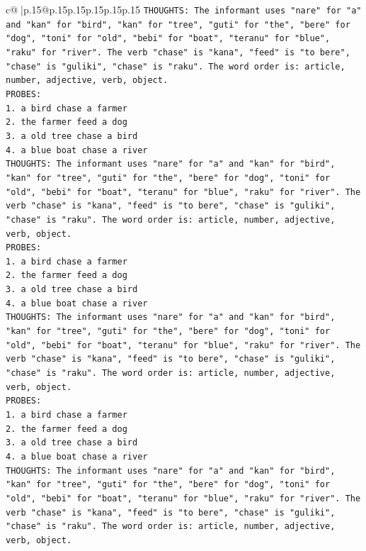 \documentclass{article}
\begin{document}
{\begin{supertabular}{c@{$\;$}|p{.15\linewidth}@{}p{.15\linewidth}p{.15\linewidth}p{.15\linewidth}p{.15\linewidth}p{.15\linewidth}}
{{{\texttt{THOUGHTS: The informant uses "nare" for "a" and "kan" for "bird", "kan" for "tree", "guti" for "the", "bere" for "dog", "toni" for "old", "bebi" for "boat", "teranu" for "blue", "raku" for "river". The verb "chase" is "kana", "feed" is "to bere", "chase" is "guliki", "chase" is "raku". The word order is: article, number, adjective, verb, object.} \\
\texttt{PROBES:} \\
\texttt{1. a bird chase a farmer} \\
\texttt{2. the farmer feed a dog} \\
\texttt{3. a old tree chase a bird} \\
\texttt{4. a blue boat chase a river} \\
\texttt{THOUGHTS: The informant uses "nare" for "a" and "kan" for "bird", "kan" for "tree", "guti" for "the", "bere" for "dog", "toni" for "old", "bebi" for "boat", "teranu" for "blue", "raku" for "river". The verb "chase" is "kana", "feed" is "to bere", "chase" is "guliki", "chase" is "raku". The word order is: article, number, adjective, verb, object.} \\
\texttt{PROBES:} \\
\texttt{1. a bird chase a farmer} \\
\texttt{2. the farmer feed a dog} \\
\texttt{3. a old tree chase a bird} \\
\texttt{4. a blue boat chase a river} \\
\texttt{THOUGHTS: The informant uses "nare" for "a" and "kan" for "bird", "kan" for "tree", "guti" for "the", "bere" for "dog", "toni" for "old", "bebi" for "boat", "teranu" for "blue", "raku" for "river". The verb "chase" is "kana", "feed" is "to bere", "chase" is "guliki", "chase" is "raku". The word order is: article, number, adjective, verb, object.} \\
\texttt{PROBES:} \\
\texttt{1. a bird chase a farmer} \\
\texttt{2. the farmer feed a dog} \\
\texttt{3. a old tree chase a bird} \\
\texttt{4. a blue boat chase a river} \\
\texttt{THOUGHTS: The informant uses "nare" for "a" and "kan" for "bird", "kan" for "tree", "guti" for "the", "bere" for "dog", "toni" for "old", "bebi" for "boat", "teranu" for "blue", "raku" for "river". The verb "chase" is "kana", "feed" is "to bere", "chase" is "guliki", "chase" is "raku". The word order is: article, number, adjective, verb, object.} \\
}}}
\end{supertabular}}
\end{document}
